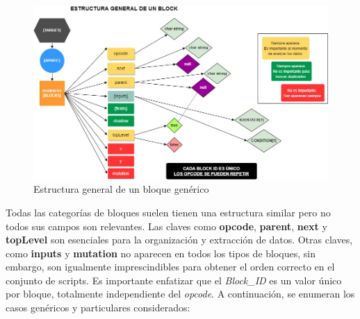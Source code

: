 \documentclass[a4paper, 12pt]{book}
\begin{document}
\begin{figure}[!htb]
  \centering
  \includegraphics[width=17cm, keepaspectratio]{img/block_general.jpg}
  \caption{Estructura general de un bloque genérico}
  \label{fig:graljson}
\end{figure}


Todas las categorías de bloques suelen tienen una estructura similar pero no todos sus campos son relevantes. Las claves como \textbf{opcode}, \textbf{parent}, \textbf{next} y \textbf{topLevel} son esenciales para la organización y extracción de datos. Otras claves, como \textbf{inputs} y \textbf{mutation} no aparecen en todos los tipos de bloques, sin embargo, son igualmente imprescindibles para obtener el orden correcto en el conjunto de scripts. Es importante enfatizar que el \textit{Block\_ID} es un valor único por bloque, totalmente independiente del \textit{opcode}. A continuación, se enumeran los casos genéricos y particulares considerados:
\end{document}
